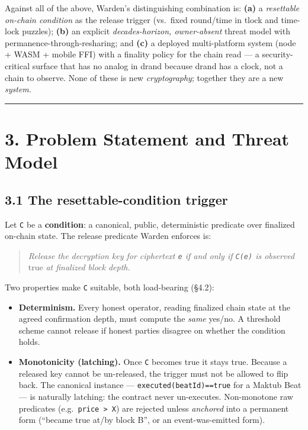 \documentclass[
  11pt,
]{article}
\providecommand{\tightlist}{%
  \setlength{\itemsep}{0pt}\setlength{\parskip}{0pt}}
\begin{document}
Against all of the above, Warden's distinguishing combination is:
\textbf{(a)} a \emph{resettable on-chain condition} as the release
trigger (vs.~fixed round/time in tlock and time-lock puzzles);
\textbf{(b)} an explicit \emph{decades-horizon, owner-absent} threat
model with permanence-through-resharing; and \textbf{(c)} a deployed
multi-platform system (node + WASM + mobile FFI) with a finality policy
for the chain read --- a security-critical surface that has no analog in
drand because drand has a clock, not a chain to observe. None of these
is new \emph{cryptography}; together they are a new \emph{system}.

\begin{center}\rule{0.5\linewidth}{0.5pt}\end{center}

\section{3. Problem Statement and Threat
Model}\label{problem-statement-and-threat-model}

\subsection{3.1 The resettable-condition
trigger}\label{the-resettable-condition-trigger}

Let \texttt{C} be a \textbf{condition}: a canonical, public,
deterministic predicate over finalized on-chain state. The release
predicate Warden enforces is:

\begin{quote}
\emph{Release the decryption key for ciphertext \texttt{e} if and only
if \texttt{C(e)} is observed} true \emph{at finalized block depth.}
\end{quote}

Two properties make \texttt{C} suitable, both load-bearing (§4.2):

\begin{itemize}
\tightlist
\item
  \textbf{Determinism.} Every honest operator, reading finalized chain
  state at the agreed confirmation depth, must compute the \emph{same}
  yes/no. A threshold scheme cannot release if honest parties disagree
  on whether the condition holds.
\item
  \textbf{Monotonicity (latching).} Once \texttt{C} becomes true it
  stays true. Because a released key cannot be un-released, the trigger
  must not be allowed to flip back. The canonical instance ---
  \texttt{executed(beatId)==true} for a Maktub Beat --- is naturally
  latching: the contract never un-executes. Non-monotone raw predicates
  (e.g.~\texttt{price\ \textgreater{}\ X}) are rejected unless
  \emph{anchored} into a permanent form (``became true at/by block B'',
  or an event-was-emitted form).
\end{itemize}
\end{document}
